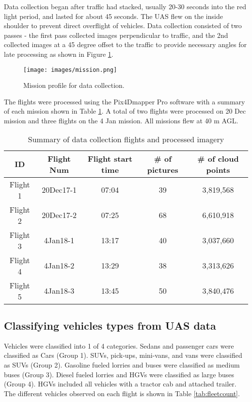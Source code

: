 \documentclass[preprint,12pt,a4paper]{elsarticle}
\begin{document}
\begin{linenumbers}
Data collection began after traffic had stacked, usually 20-30 seconds into the red light period, and lasted for about 45 seconds. The UAS flew on the inside shoulder to prevent direct overflight of vehicles. Data collection consisted of two passes - the first pass collected images perpendicular to traffic, and the 2nd collected images at a 45 degree offset to the traffic to provide necessary angles for late processing as shown in Figure \ref{fig:mission}.

\begin{figure}[H]
\centering
\texttt{[image: images/mission.png]} 
\caption{Mission profile for data collection.}
\label{fig:mission}
\end{figure}

The flights were processed using the Pix4Dmapper Pro software with a summary of each mission shown in Table \ref{tb:flightdata}. A total of two flights were processed on 20 Dec mission and three flights on the 4 Jan mission. All missions flew at 40 m AGL.

\begin{table}[H]
\centering
\caption{Summary of data collection flights and processed imagery}
\label{tb:flightdata}
\begin{tabular}{@{}ccccc@{}}
\toprule
\textbf{ID} & \textbf{Flight Num} &\textbf{Flight start time} & \textbf{\# of pictures} & \textbf{\# of cloud points} \\ \midrule
Flight 1 & 20Dec17-1 & 07:04 & 39 & 3,819,568 \\
Flight 2 &20Dec17-2 & 07:25 & 68 & 6,610,918 \\
Flight 3 &4Jan18-1 & 13:17 & 40 & 3,037,660 \\
Flight 4 &4Jan18-2 & 13:29 & 38 & 3,313,626 \\
Flight 5 &4Jan18-3 & 13:45 & 50 & 3,840,476 \\ \bottomrule
\end{tabular}
\end{table}


\subsection{Classifying vehicles types from UAS data}
Vehicles were classified into 1 of 4 categories. Sedans and passenger cars were classified as Cars (Group 1). SUVs,  pick-ups, mini-vans, and vans were classified as SUVs (Group 2). Gasoline fueled lorries and buses were classified as medium buses (Group 3). Diesel fueled lorries and HGVs were classified as large buses (Group 4). HGVs included all vehicles with a tractor cab and attached trailer. The different vehicles observed on each flight is shown in Table \ref{tab:fleetcount}.


\end{linenumbers}
\end{document}
